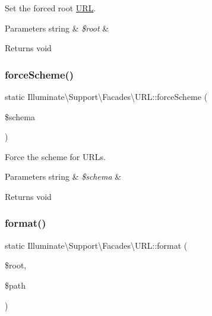 Set the forced root \mbox{\hyperlink{class_illuminate_1_1_support_1_1_facades_1_1_u_r_l}{U\+RL}}.


\begin{DoxyParams}[1]{Parameters}
string & {\em \$root} & \\
\hline
\end{DoxyParams}
\begin{DoxyReturn}{Returns}
void 
\end{DoxyReturn}
\mbox{\label{class_illuminate_1_1_support_1_1_facades_1_1_u_r_l_a6916466007e7e72617612a1c5c012b16}} 
\subsubsection{\texorpdfstring{force\+Scheme()}{forceScheme()}}
{\footnotesize\ttfamily static Illuminate\textbackslash{}\+Support\textbackslash{}\+Facades\textbackslash{}\+U\+R\+L\+::force\+Scheme (\begin{DoxyParamCaption}\item[{}]{\$schema }\end{DoxyParamCaption})\hspace{0.3cm}{\ttfamily [static]}}

Force the scheme for U\+R\+Ls.


\begin{DoxyParams}[1]{Parameters}
string & {\em \$schema} & \\
\hline
\end{DoxyParams}
\begin{DoxyReturn}{Returns}
void 
\end{DoxyReturn}
\mbox{\label{class_illuminate_1_1_support_1_1_facades_1_1_u_r_l_a6a75a7c03134b39ada6561c664766570}} 
\subsubsection{\texorpdfstring{format()}{format()}}
{\footnotesize\ttfamily static Illuminate\textbackslash{}\+Support\textbackslash{}\+Facades\textbackslash{}\+U\+R\+L\+::format (\begin{DoxyParamCaption}\item[{}]{\$root,  }\item[{}]{\$path }\end{DoxyParamCaption})\hspace{0.3cm}{\ttfamily [static]}}

